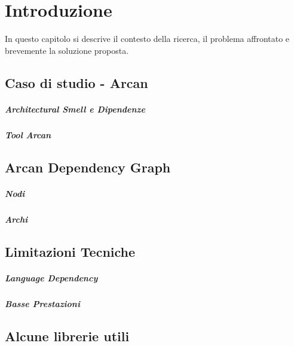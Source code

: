 \chapter{Introduzione}

In questo capitolo si descrive il contesto della ricerca, il problema affrontato e brevemente la soluzione proposta.

\section{Caso di studio - Arcan}

\paragraph{Architectural Smell e Dipendenze}

\paragraph{Tool Arcan}

\section{Arcan Dependency Graph}

\paragraph{Nodi}

\paragraph{Archi}

\section{Limitazioni Tecniche}

\paragraph{Language Dependency}

\paragraph{Basse Prestazioni}

\section{Alcune librerie utili}

